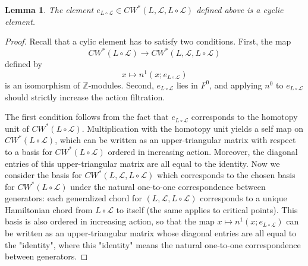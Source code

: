 \documentclass{amsart}
\newtheorem{lemma}[theorem]{Lemma}
\numberwithin{equation}{section}
\numberwithin{figure}{section}
\begin{document}
\begin{lemma}
	The element $e_{L \circ \mathcal{L}} \in CW^{*}(L, \mathcal{L}, L \circ \mathcal{L})$ defined above is a cyclic element.
\end{lemma}
\begin{proof}
	Recall that a cylic element has to satisfy two conditions. First, the map
\begin{equation*}
CW^{*}(L \circ \mathcal{L}) \to CW^{*}(L, \mathcal{L}, L \circ \mathcal{L})
\end{equation*}
defined by
\begin{equation*}
x \mapsto n^{1}(x; e_{L \circ \mathcal{L}})
\end{equation*}
is an isomorphism of $\mathbb{Z}$-modules.
Second, $e_{L \circ \mathcal{L}}$ lies in $F^{0}$, and applying $n^{0}$ to $e_{L \circ \mathcal{L}}$ should strictly increase the action filtration. \par
	The first condition follows from the fact that $e_{L \circ \mathcal{L}}$ corresponds to the homotopy unit of $CW^{*}(L \circ \mathcal{L})$. Multiplication with the homotopy unit yields a self map on $CW^{*}(L \circ \mathcal{L})$, which can be written as an upper-triangular matrix with respect to a basis for $CW^{*}(L \circ \mathcal{L})$ ordered in increasing action. Moreover, the diagonal entries of this upper-triangular matrix are all equal to the identity. Now we consider the basis for $CW^{*}(L, \mathcal{L}, L \circ \mathcal{L})$ which corresponds to the chosen basis for $CW^{*}(L \circ \mathcal{L})$ under the natural one-to-one correspondence between generators: each generalized chord for $(L, \mathcal{L}, L \circ \mathcal{L})$ corresponds to a unique Hamiltonian chord from $L \circ \mathcal{L}$ to itself (the same applies to critical points). This basis is also ordered in increasing action, so that the map $x \mapsto n^{1}(x; e_{L \circ \mathcal{L}})$ can be written as an upper-triangular matrix whose diagonal entries are all equal to the "identity", where this "identity" means the natural one-to-one correspondence between generators. \par
	

\end{proof}
\end{document}
